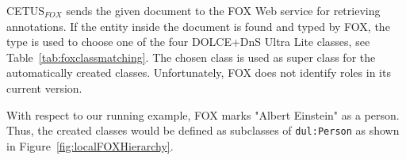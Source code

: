 CETUS$_{FOX}$ sends the given document to the FOX Web service for retrieving annotations.
If the entity inside the document is found and typed by FOX, the type is used to choose one of the four DOLCE+DnS Ultra Lite classes, see Table~\ref{tab:foxclassmatching}.
The chosen class is used as super class for the automatically created classes.
Unfortunately, FOX does not identify roles in its current version.

With respect to our running example, FOX marks "Albert Einstein" as a person.
Thus, the created classes would be defined as subclasses of \texttt{dul:Person} as shown in Figure~\ref{fig:localFOXHierarchy}.


